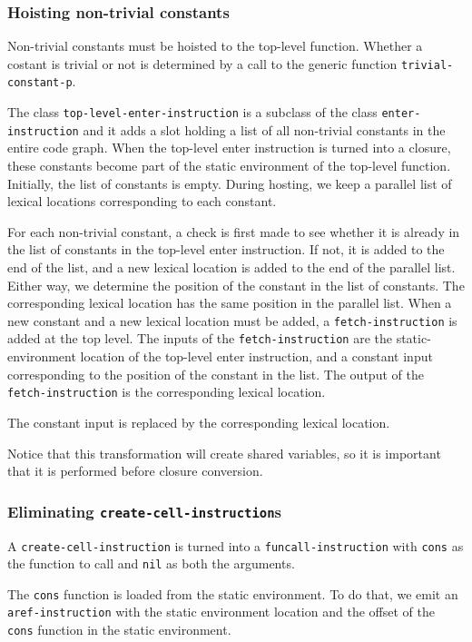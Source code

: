 \subsubsection{Hoisting non-trivial constants}

Non-trivial constants must be hoisted to the top-level function.
Whether a costant is trivial or not is determined by a call to the
generic function \texttt{trivial-constant-p}.

The class \texttt{top-level-enter-instruction} is a subclass of the
class \texttt{enter-instruction} and it adds a slot holding a list of
all non-trivial constants in the entire code graph.  When the
top-level enter instruction is turned into a closure, these constants
become part of the static environment of the top-level function.
Initially, the list of constants is empty.  During hosting, we keep a
parallel list of lexical locations corresponding to each constant.

For each non-trivial constant, a check is first made to see whether it
is already in the list of constants in the top-level enter
instruction.  If not, it is added to the end of the list, and a new
lexical location is added to the end of the parallel list.  Either
way, we determine the position of the constant in the list of
constants.  The corresponding lexical location has the same position
in the parallel list.  When a new constant and a new lexical location
must be added, a \texttt{fetch-instruction} is added at the top level.
The inputs of the \texttt{fetch-instruction} are the
static-environment location of the top-level enter instruction, and a
constant input corresponding to the position of the constant in the
list.  The output of the \texttt{fetch-instruction} is the
corresponding lexical location.

The constant input is replaced by the corresponding lexical location.

Notice that this transformation will create shared variables, so it is
important that it is performed before closure conversion.

\subsubsection{Eliminating \texttt{create-cell-instruction}s}

A \texttt{create-cell-instruction} is turned into a
\texttt{funcall-instruction} with \texttt{cons} as the function to
call and \texttt{nil} as both the arguments.

The \texttt{cons} function is loaded from the static environment.  To
do that, we emit an \texttt{aref-instruction} with the static
environment location and the offset of the \texttt{cons} function in
the static environment.

